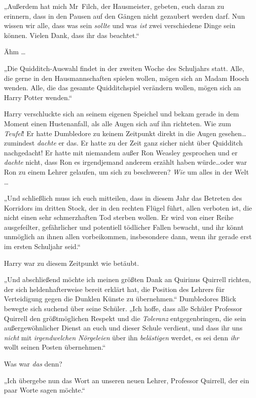 {„Außerdem hat mich Mr~Filch, der Hausmeister, gebeten, euch daran zu erinnern, dass in den Pausen auf den Gängen nicht gezaubert werden darf. Nun wissen wir alle, dass was sein \emph{sollte} und was \emph{ist} zwei verschiedene Dinge sein können. Vielen Dank, dass ihr das beachtet.“

Ähm …

„Die Quidditch-Auswahl findet in der zweiten Woche des Schuljahrs statt. Alle, die gerne in den Hausmannschaften spielen wollen, mögen sich an Madam Hooch wenden. Alle, die das gesamte Quidditchspiel verändern wollen, mögen sich an Harry Potter wenden.“

Harry verschluckte sich an seinem eigenen Speichel und bekam gerade in dem Moment einen Hustenanfall, als alle Augen sich auf ihn richteten. Wie zum \emph{Teufel}! Er hatte Dumbledore zu keinem Zeitpunkt direkt in die Augen gesehen…zumindest \emph{dachte} er das. Er hatte zu der Zeit ganz sicher nicht über Quidditch nachgedacht! Er hatte mit niemandem außer Ron Weasley gesprochen und er \emph{dachte} nicht, dass Ron es irgendjemand anderem erzählt haben würde…oder war Ron zu einem Lehrer gelaufen, um sich zu beschweren? \emph{Wie} um alles in der Welt …

„Und schließlich muss ich euch mitteilen, dass in diesem Jahr das Betreten des Korridors im dritten Stock, der in den rechten Flügel führt, allen verboten ist, die nicht einen sehr schmerzhaften Tod sterben wollen. Er wird von einer Reihe ausgefeilter, gefährlicher und potentiell tödlicher Fallen bewacht, und ihr könnt unmöglich an ihnen allen vorbeikommen, insbesondere dann, wenn ihr gerade erst im ersten Schuljahr seid.“

Harry war zu diesem Zeitpunkt wie betäubt.

„Und abschließend möchte ich meinen größten Dank an Quirinus Quirrell richten, der sich heldenhafterweise bereit erklärt hat, die Position des Lehrers für Verteidigung gegen die Dunklen Künste zu übernehmen.“ Dumbledores Blick bewegte sich suchend über seine Schüler. „Ich hoffe, dass alle Schüler Professor Quirrell den größtmöglichen Respekt und die \emph{Toleranz} entgegenbringen, die sein außergewöhnlicher Dienst an euch und dieser Schule verdient, und dass ihr uns \emph{nicht} mit \emph{irgendwelchen Nörgeleien} über ihn \emph{belästigen} werdet, es sei denn \emph{ihr} wollt seinen Posten übernehmen.“

Was war \emph{das} denn?

„Ich übergebe nun das Wort an unseren neuen Lehrer, Professor Quirrell, der ein paar Worte sagen möchte.“

}

